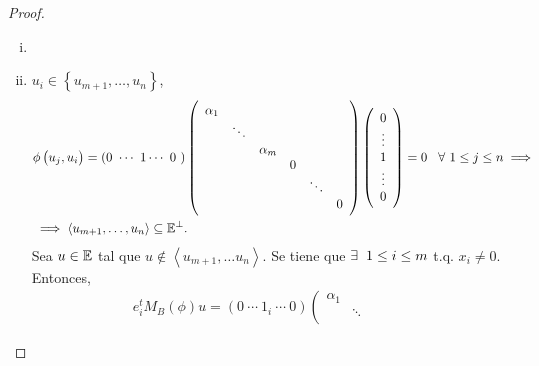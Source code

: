 \begin{proof}
    \begin{enumerate}[i)]
        \item[]
        \item \addtocounter{enumi}{1}
            $u_i  \in \left\{u_{m+1}, \dots , u_n \right\}$,
            \[
                \begin{aligned}
                    &\phi \left( u_j, u_i \right) = \left( 0 \ \cdots \ 1 \cdots \ 0 \ \right) \left(
                    \begin{array}{cccccc}
                        \alpha _1 &  &  &  &  &  \\
                         & \ddots &  &  &  &  \\
                         &  & \alpha _m &  &  & \\
                         &  &  & 0 &  &   \\
                         &  & \ &  & \ddots &  \\
                         &  &  &  &  & 0
                    \end{array} \right) \left(
                    \begin{array}{c}
                         0  \\
                         \vdots  \\
                         1  \\
                         \vdots \\
                         0
                    \end{array} \right) = 0 \hspace{0,3cm} \forall \hspace{0,12cm} 1 \leq j \leq n
                    \implies \\
                    &\implies \left< u_{m+1} , \dots , u_n \right> \subseteq \E^{\perp}.
                \end{aligned}
            \]
            Sea $u \in \mathbb{E}$ tal que $u \notin \left< u_{m+1}, \dots u_n \right> $. Se tiene que $\exists \hspace{0,2cm} 1 \leq i \leq m$ t.q. $x_i \neq 0$. Entonces,
            \[
                \begin{aligned}
                    e_i^t M_B\left( \phi \right) u = \left(0 \ \cdots \ 1 _i \ \cdots \ 0 \right) \left(
                    \begin{array}{cccccc}
                        \alpha _1 &  &  &  &  &  \\
                         & \ddots &  &  &  &  \\

\end{array}
\end{aligned}\]
\end{enumerate}
\end{proof}
